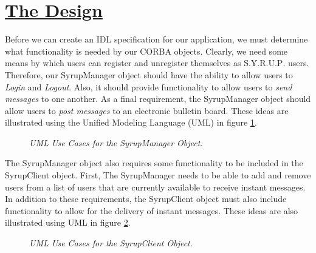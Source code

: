 \section*{\underline{The Design}}

Before we can create an IDL specification for our application, we must 
determine what functionality is needed by our CORBA objects.  Clearly, 
we need some means by which users can register and unregister themselves
as S$.$Y$.$R$.$U$.$P$.$ users.  Therefore, our SyrupManager object should 
have the ability to allow users to {\em{Login}} and {\em{Logout}}.  
Also, it should provide functionality to allow users to {\em{send messages}} 
to one another. As a final requirement, the SyrupManager object should allow 
users to {\em{post messages}} to an electronic bulletin board.  These 
ideas are illustrated using the Unified Modeling Language (UML) in figure 
\ref{SyrupManagerUseCases}. 
\begin{figure}
\begin{center}
\leavevmode
\caption{\em{UML Use Cases for the SyrupManager Object}.}
\figline
         \label{SyrupManagerUseCases}
\end{center}
\end{figure}

The SyrupManager object also requires some functionality to be included 
in the SyrupClient object.  First, The SyrupManager needs 
to be able to add and remove users from a list of users that are currently 
available to receive instant messages.  In addition to these requirements, 
the SyrupClient object must also include functionality to allow for the 
delivery of instant messages. These ideas are also illustrated using UML in 
figure \ref{SyrupClientUseCases}.
\begin{figure}
\begin{center}
\leavevmode
\caption{\em{UML Use Cases for the SyrupClient Object}.}
\figline
         \label{SyrupClientUseCases}
\end{center}
\end{figure}

